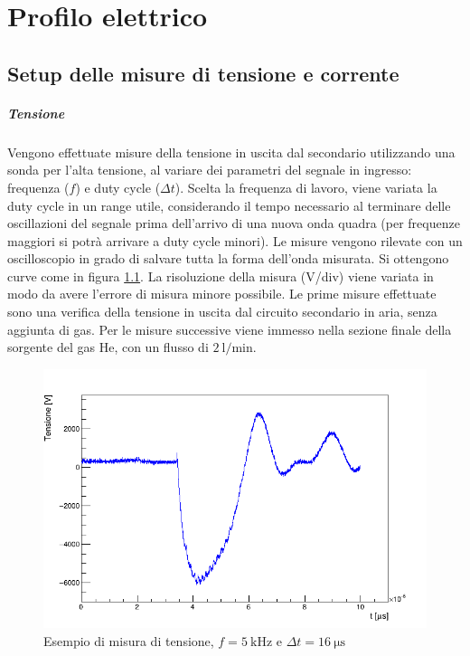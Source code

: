 \chapter{Profilo elettrico}
\label{ch:elettrico}

\section{Setup delle misure di tensione e corrente}


\paragraph{Tensione}Vengono effettuate misure della tensione in uscita dal secondario utilizzando una sonda per l'alta tensione, al variare dei parametri del segnale in ingresso: frequenza ($f$) e duty cycle ($\Delta t$). Scelta la frequenza di lavoro, viene variata la duty cycle in un range utile, considerando il tempo necessario al terminare delle oscillazioni del segnale prima dell'arrivo di una nuova onda quadra (per frequenze maggiori si potrà arrivare a duty cycle minori).
Le misure vengono rilevate con un oscilloscopio in grado di salvare tutta la forma dell'onda misurata. Si ottengono curve come in figura \ref{fig:tensione_es}. La risoluzione della misura (V/div) viene variata in modo da avere l'errore di misura minore possibile.
Le prime misure effettuate sono una verifica della tensione in uscita dal circuito secondario in aria, senza aggiunta di gas.
Per le misure successive viene immesso nella sezione finale della sorgente del gas He, con un flusso di $\SI{2}{\litre/\minute}$.

\begin{figure}
\centering
\includegraphics[width=.7\textwidth]{Immagini/tensione_es_2.png}
\caption{Esempio di misura di tensione, $f = \SI{5}{\kilo\hertz}$ e $\Delta t = \SI{16}{\micro\second}$}
\label{fig:tensione_es}
\end{figure}

